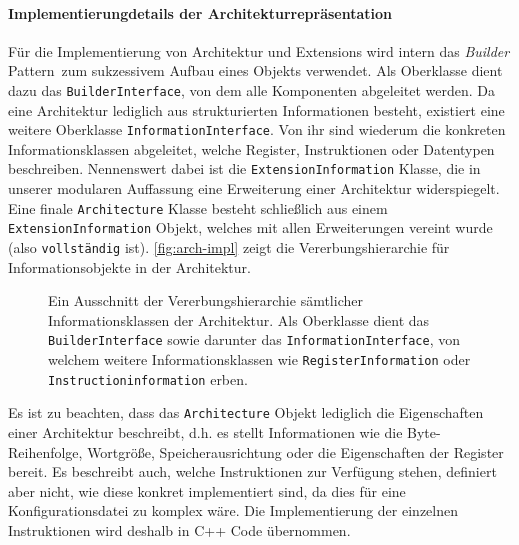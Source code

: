 
\paragraph{Implementierungdetails der Architekturrepräsentation}
\label{dev:arch-impl}

Für die Implementierung von Architektur und Extensions wird intern das
\emph{Builder} Pattern\ zum sukzessivem Aufbau eines Objekts verwendet. Als
Oberklasse dient dazu das \texttt{BuilderInterface}, von dem alle Komponenten
abgeleitet werden. Da eine Architektur lediglich aus strukturierten
Informationen besteht, existiert eine weitere Oberklasse
\texttt{InformationInterface}. Von ihr sind wiederum die konkreten
Informationsklassen abgeleitet, welche Register, Instruktionen oder Datentypen
beschreiben. Nennenswert dabei ist die \texttt{ExtensionInformation} Klasse, die
in unserer modularen Auffassung eine Erweiterung einer Architektur
widerspiegelt. Eine finale \texttt{Architecture} Klasse besteht schließlich aus
einem \texttt{ExtensionInformation} Objekt, welches mit allen Erweiterungen
vereint wurde (also \texttt{vollständig} ist). \autoref{fig:arch-impl} zeigt die
Vererbungshierarchie für Informationsobjekte in der Architektur.

\begin{figure}[h!]
  \centering
  \caption{Ein Ausschnitt der Vererbungshierarchie sämtlicher Informationsklassen der Architektur. Als Oberklasse dient das \texttt{BuilderInterface} sowie darunter das \texttt{InformationInterface}, von welchem weitere Informationsklassen wie \texttt{RegisterInformation} oder \texttt{Instructioninformation} erben.}
  \label{fig:arch-impl}
\end{figure}

Es ist zu beachten, dass das \texttt{Architecture} Objekt lediglich die
Eigenschaften einer Architektur beschreibt, d.h. es stellt Informationen wie die
Byte-Reihenfolge, Wortgröße, Speicherausrichtung oder die Eigenschaften der
Register bereit. Es beschreibt auch, welche Instruktionen zur Verfügung stehen,
definiert aber nicht, wie diese konkret implementiert sind, da dies für eine
Konfigurationsdatei zu komplex wäre. Die Implementierung der einzelnen
Instruktionen wird deshalb in C++ Code übernommen.
